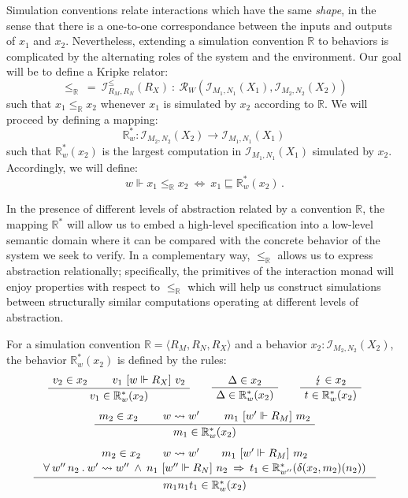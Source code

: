 \documentclass[acmsmall,timestamp,review]{acmart}
\newcommand{\ifr}[1]{\ [{#1}]\ }
\begin{document}
Simulation conventions relate interactions which have the same \emph{shape},
in the sense that there is a one-to-one correspondance between
the inputs and outputs of $x_1$ and $x_2$.
Nevertheless,
extending a simulation convention $\mathbb{R}$ to behaviors
is complicated by the alternating roles of the system and the environment.
Our goal will be to define a Kripke relator:
\[ {\le}_\mathbb{R} \: = \:
   \mathcal{I}^\le_{R_M,R_N}(R_X) \: : \:
   \mathcal{R}_W(\mathcal{I}_{M_1,N_1}(X_1), \mathcal{I}_{M_2,N_2}(X_2)) \]
such that $x_1 \le_\mathbb{R} x_2$
whenever $x_1$ is simulated by $x_2$ according to $\mathbb{R}$.
We will proceed by defining a mapping:
\[ \mathbb{R}^*_w : \mathcal{I}_{M_2,N_2}(X_2) \rightarrow
                    \mathcal{I}_{M_1,N_1}(X_1) \, \]
such that $\mathbb{R}^*_w(x_2)$ is
the largest computation in $\mathcal{I}_{M_1,N_1}(X_1)$
simulated by $x_2$.
Accordingly,
we will define:
\[ w \Vdash x_1 \le_\mathbb{R} x_2 \: \Leftrightarrow \:
   x_1 \sqsubseteq \mathbb{R}^*_w(x_2) \,. \]

In the presence of different levels of abstraction
related by a convention $\mathbb{R}$,
the mapping $\mathbb{R}^*$ will allow us to embed a high-level specification
into a low-level semantic domain
where it can be compared with
the concrete behavior of the system we seek to verify.
In a complementary way, $\le_\mathbb{R}$
allows us to express abstraction relationally;
specifically, the primitives of the interaction monad
will enjoy properties with respect to $\le_\mathbb{R}$
which will help us construct
simulations between
structurally similar computations
operating at different levels of abstraction.

\begin{definition}
For a simulation convention $\mathbb{R} = \langle R_M, R_N, R_X \rangle$
and a behavior $x_2 : \mathcal{I}_{M_2, N_2}(X_2)$,
the behavior $\mathbb{R}^*_w(x_2)$ is defined by the rules:
\begin{gather*}
  \AxiomC{$v_2 \in x_2$}
  \AxiomC{$v_1 \ifr{w \Vdash R_X} v_2$}
  \BinaryInfC{$v_1 \in \mathbb{R}^*_w(x_2)$}
  \DisplayProof
  \qquad
  \AxiomC{$\Delta \in x_2$}
  \UnaryInfC{$\Delta \in \mathbb{R}^*_w(x_2)$}
  \DisplayProof
  \qquad
  \AxiomC{$\lightning \in x_2$}
  \UnaryInfC{$t \in \mathbb{R}^*_w(x_2)$}
  \DisplayProof
  \\[1ex]
  \AxiomC{$m_2 \in x_2$}
  \AxiomC{$w \leadsto w'$}
  \AxiomC{$m_1 \ifr{w' \Vdash R_M} m_2$}
  \TrinaryInfC{$m_1 \in \mathbb{R}^*_w(x_2)$}
  \DisplayProof
  \\[1ex]
  \AxiomC{$
    \begin{array}{c}
      m_2 \in x_2 \qquad
      w \leadsto w' \qquad
      m_1 \ifr{w' \Vdash R_M} m_2
      \\[.3ex]
      \forall \: w'' \, n_2 \:.\:
        w' \leadsto w'' \: \wedge \:
        n_1 \ifr{w'' \Vdash R_N} n_2 \: \Rightarrow \:
        t_1 \in \mathbb{R}^*_{w''}(\delta(x_2, m_2)(n_2))
    \end{array}$}
  \UnaryInfC{$m_1 n_1 t_1 \in \mathbb{R}^*_w(x_2)$}
  \DisplayProof
\end{gather*}
\end{definition}
\end{document}

